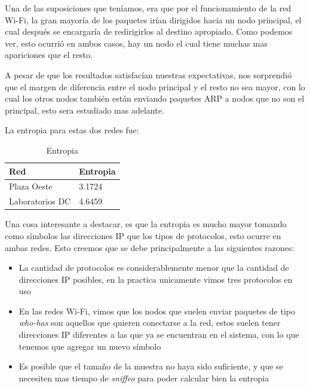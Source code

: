 Una de las suposiciones que teníamos, era que por el funcionamiento de la red Wi-Fi, la gran mayoría de los paquetes irían dirigidos hacia un nodo principal, el cual después se encargaría de redirigirlos al destino apropiado. Como podemos ver, esto ocurrió en ambos casos, hay un nodo el cual tiene muchas mas apariciones que el resto.

A pesar de que los resultados satisfacían nuestras expectativas, nos sorprendió que el margen de diferencia entre el nodo principal y el resto no sea mayor, con lo cual los otros nodos también están enviando paquetes ARP a nodos que no son el principal, esto sera estudiado mas adelante.
%

La entropia para estas dos redes fue:

\begin{table}[H]
\centering
\caption{Entropia}
\label{my-label}
\begin{tabular}{ll}
\hline
Red         & Entropia \\ \hline
Plaza Oeste & 3.1724   \\
Laboratorios DC    & 4.6459   \\ \hline
\end{tabular}
\end{table}

Una cosa interesante a destacar, es que la entropia es mucho mayor tomando como símbolos las direcciones IP que los tipos de protocolos, esto ocurre en ambas redes. Esto creemos que se debe principalmente a las siguientes razones:

\begin{itemize}
	\item La cantidad de protocolos es considerablemente menor que la cantidad de direcciones IP posibles, en la practica unicamente vimos tres protocolos en uso
	\item En las redes Wi-Fi, vimos que los nodos que suelen enviar paquetes de tipo \textit{who-has} son aquellos que quieren conectarse a la red, estos suelen tener direcciones IP diferentes a las que ya se encuentran en el sistema, con lo que tenemos que agregar un nuevo símbolo
	\item Es posible que el tamaño de la muestra no haya sido suficiente, y que se necesiten mas tiempo de \textit{sniffeo} para poder calcular bien la entropia
\end{itemize}

